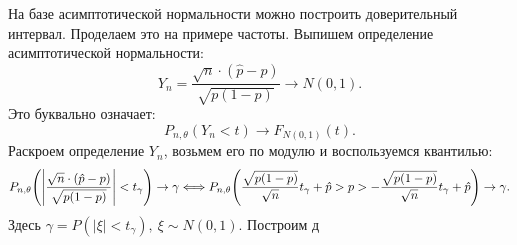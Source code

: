 На базе асимптотической нормальности можно построить доверительный интервал.
Проделаем это на примере частоты. Выпишем определение асимптотической
нормальности:
\[
    Y_n = \frac{\sqrt{n} \cdot (\hat{p} - p)}{\sqrt{p(1 - p)}} \to N(0, 1)
.\]
Это буквально означает:
\[
    P_{n, \theta}(Y_n < t) \to F_{N(0, 1)}(t) 
.\]
Раскроем определение $Y_n$, возьмем его по модулю и воспользуемся квантилью:
\[
    P_{n, \theta}\parens*{\abs*{\frac{\sqrt{n} 
    \cdot (\hat{p} - p)}{\sqrt{p(1 - p)}} } < t_\gamma} \to \gamma \Llra
    P_{n, \theta}\parens*{\frac{\sqrt{p(1 - p)}}{\sqrt{n}}t_\gamma + \hat{p}
    > p > -\frac{\sqrt{p(1 - p)}}{\sqrt{n}}t_\gamma + \hat{p}} \to \gamma
.\]
Здесь $\gamma = P(|\xi| < t_\gamma),~ \xi \sim N(0, 1)$.
Построим д

